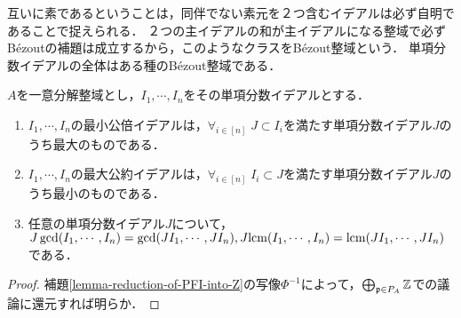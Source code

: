 \documentclass[uplatex,dvipdfmx]{jsreport}
\begin{document}
\begin{tcolorbox}[colframe=ForestGreen, colback=ForestGreen!10!white,breakable,colbacktitle=ForestGreen!40!white,coltitle=black,fonttitle=\bfseries\sffamily,
title=]
    互いに素であるということは，同伴でない素元を２つ含むイデアルは必ず自明であることで捉えられる．
    ２つの主イデアルの和が主イデアルになる整域で必ずBézoutの補題は成立するから，このようなクラスをBézout整域という．
    単項分数イデアルの全体はある種のBézout整域である．
\end{tcolorbox}

\begin{proposition}\label{prop-characterization-of-gcd-lcm}
    $A$を一意分解整域とし，$I_1,\cdots,I_n$をその単項分数イデアルとする．
    \begin{enumerate}
        \item $I_1,\cdots,I_n$の最小公倍イデアルは，$\forall_{i\in[n]}\;J\subset I_i$を満たす単項分数イデアル$J$のうち最大のものである．
        \item $I_1,\cdots,I_n$の最大公約イデアルは，$\forall_{i\in[n]}\;I_i\subset J$を満たす単項分数イデアル$J$のうち最小のものである．
        \item 任意の単項分数イデアル$J$について，$J\gcd(I_1,\cdots,I_n)=\gcd(JI_1,\cdots,JI_n),J\mathrm{lcm}(I_1,\cdots,I_n)=\mathrm{lcm}(JI_1,\cdots,JI_n)$である．
    \end{enumerate}
\end{proposition}
\begin{proof}
    補題\ref{lemma-reduction-of-PFI-into-Z}の写像$\Phi^{-1}$によって，$\bigoplus_{\mathfrak{p}\in P_A}\mathbb{Z}$での議論に還元すれば明らか．
\end{proof}
\end{document}
